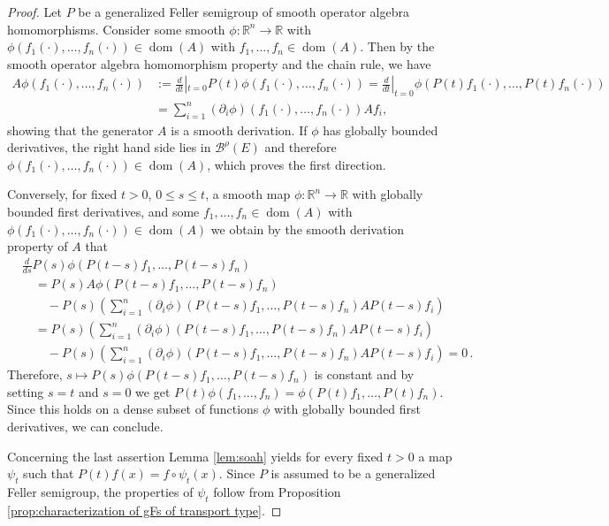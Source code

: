 \documentclass[a4paper,12pt]{article}
\theoremstyle{definition}
\theoremstyle{remark}
\numberwithin{equation}{section}
\numberwithin{theorem}{section}
\begin{document}
\begin{proof}
Let $P$ be a generalized Feller semigroup of smooth operator algebra homomorphisms. 
Consider some smooth $ \phi: \mathbb{R}^n \to \mathbb{R}$ with $\phi(f_1(\cdot),\ldots,f_n(\cdot)) \in \operatorname{dom}(A) $ with $f_1,\ldots,f_n \in \operatorname{dom}(A)$. 
Then by the smooth operator algebra homomorphism property and the chain rule, we have
\begin{align*}
A\phi(f_1(\cdot),\ldots,f_n(\cdot))&:=
\frac{d}{dt}|_{t=0}P(t) \phi(f_1(\cdot),\ldots,f_n(\cdot))=\frac{d}{dt}|_{t=0}\phi(P(t)f_1(\cdot),\ldots,P(t)f_n(\cdot))\\
&=\sum_{i=1}^n (\partial_i \phi)(f_1(\cdot),\ldots,f_n(\cdot))  A f_i,
\end{align*}
showing that the generator $A$ is a smooth derivation. If $\phi$ has globally bounded derivatives, the right hand side lies in $\mathcal{\mathscr{B}}^{\rho}(E)$ and therefore 
$\phi(f_1(\cdot),\ldots,f_n(\cdot)) \in \operatorname{dom}(A)$, which proves the first direction.

 

Conversely, for fixed $t > 0$, $0 \leq s \leq t $, a smooth map $\phi : \mathbb{R}^n \to \mathbb{R}$ with globally bounded first derivatives, and some $f_1,\ldots,f_n \in \operatorname{dom}(A)$ with $\phi(f_1(\cdot),\ldots,f_n(\cdot)) \in \operatorname{dom}(A)$ we obtain by the smooth derivation property of $A$ that
\begin{align*}
&\frac{d}{ds} P(s)\phi(P(t-s)f_1, \ldots, P(t-s)f_n) \\
 &\quad = P(s) A \phi(P(t-s)f_1, \ldots, P(t-s)f_n)  \\ & \quad \quad- P(s)(\sum_{i=1}^n (\partial_i \phi)(P(t-s)f_1,\ldots,P(t-s)f_n)  A P(t-s) f_i)\\
&\quad  =P(s)(\sum_{i=1}^n (\partial_i \phi)(P(t-s)f_1,\ldots,P(t-s)f_n)  A P(t-s) f_i) \\ & \quad \quad  - P(s)(\sum_{i=1}^n (\partial_i \phi)(P(t-s)f_1,\ldots,P(t-s)f_n)  A P(t-s) f_i)=0 \, .
\end{align*}
Therefore,  $s \mapsto P(s)\phi(P(t-s)f_1, \ldots, P(t-s)f_n) $ is constant and by setting $s=t$ and $s=0$ we get $P(t)\phi(f_1,\ldots, f_n) = \phi(P(t) f_1,\ldots, P(t) f_n)$. Since this holds on a dense subset of functions $\phi$ with globally bounded first derivatives, we can conclude.

Concerning the last assertion Lemma \ref{lem:soah} yields for every fixed $t >0$ a map $\psi_t$ such that $P(t)f(x)=f \circ \psi_t(x)$. Since $P$ is assumed to be a generalized Feller semigroup, the properties of $\psi_t$
follow from Proposition \ref{prop:characterization of gFs of transport type}.
\end{proof}
\end{document}
